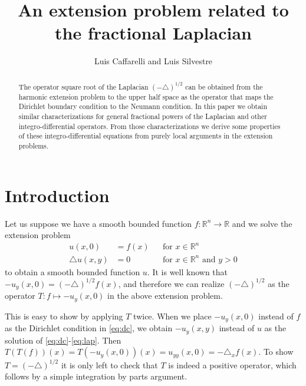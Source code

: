 \documentclass[letterpaper]{article}
\title{An extension problem related to the fractional Laplacian}
\author{Luis Caffarelli and Luis Silvestre}
\numberwithin{equation}{section}
\newcommand{\R}{\mathbb R}
\newcommand{\lap} {\triangle}
\newcommand{\party}[1] {#1_y}
\begin{document}
\maketitle

\begin{abstract}
The operator square root of the Laplacian $(-\lap)^{1/2}$ can be obtained from the harmonic extension problem to the upper half space as the operator that maps the Dirichlet boundary condition to the Neumann condition. In this paper we obtain similar characterizations for general fractional powers of the Laplacian and other integro-differential operators. From those characterizations we derive some properties of these integro-differential equations from purely local arguments in the extension problems.
\end{abstract}

\section{Introduction}

Let us suppose we have a smooth bounded function $f : \R^n \to \R$ and we solve the extension problem
\begin{align}
u(x,0) &= f(x) && \text{for } x \in \R^n \label{eq:dc}\\
\lap u(x,y) &= 0 && \text{for } x \in \R^n \text{ and } y > 0 \label{eq:lap}
\end{align}
to obtain a smooth bounded function $u$. It is well known that $-u_y (x,0) = (-\lap)^{1/2} f(x)$, and therefore we can realize $(-\lap)^{1/2}$ as the operator $T : f \mapsto -\party u (x,0)$ in the above extension problem.

This is easy to show by applying $T$ twice. When we place $-u_y(x,0)$ instead of $f$ as the Dirichlet condition in \eqref{eq:dc}, we obtain $-u_y(x,y)$ instead of $u$ as the solution of \eqref{eq:dc}-\eqref{eq:lap}. Then $T(T(f))(x) = T(-u_y(x,0))(x) = u_{yy}(x,0) = - \lap_{x} f(x)$. To show $T = (-\lap)^{1/2}$ it is only left to check that $T$ is indeed a positive operator, which follows by a simple integration by parts argument.
\end{document}

